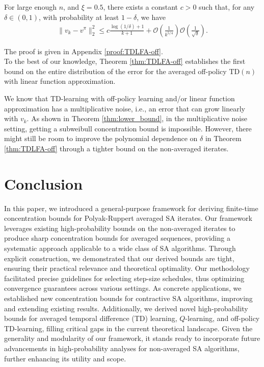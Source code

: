 \documentclass[letterpaper, 10 pt]{article}
\begin{document}
\begin{theorem}\label{thm:TDLFA-off}
    For large enough $n$, and $\xi=0.5$, there exists a constant $c>0$ such that, for any $\delta\in(0,1)$, with probability at least $1-\delta$, we have
    \begin{align*}
        \|v_k-v^\pi\|^2_2\leq c\frac{\log(1/\delta)+1}{k+1} + \mathcal{O}\left(\frac{1}{k^{5/4}}\right)\mathcal{O}\left(\frac{1}{\sqrt{\delta}}\right).
    \end{align*}
\end{theorem}
The proof is given in Appendix \ref{proof:TDLFA-off}.\\

To the best of our knowledge, Theorem \ref{thm:TDLFA-off} establishes the first bound on the entire distribution of the error for the averaged off-policy TD$(n)$ with linear function approximation.



\begin{remark}
We know that TD-learning with off-policy learning and/or linear function approximation has a multiplicative noise, i.e., an error that can grow linearly with $v_k$. As shown in Theorem \ref{thm:lower_bound}, in the multiplicative noise setting, getting a subweibull concentration bound is impossible. However, there might still be room to improve the polynomial dependence on $\delta$ in Theorem \ref{thm:TDLFA-off} through a tighter bound on the non-averaged iterates.    
\end{remark}



\section{Conclusion}
In this paper, we introduced a general-purpose framework for deriving finite-time concentration bounds for Polyak-Ruppert averaged SA iterates. Our framework leverages existing high-probability bounds on the non-averaged iterates to produce sharp concentration bounds for averaged sequences, providing a systematic approach applicable to a wide class of SA algorithms. Through explicit construction, we demonstrated that our derived bounds are tight, ensuring their practical relevance and theoretical optimality. Our methodology facilitated precise guidelines for selecting step-size schedules, thus optimizing convergence guarantees across various settings. As concrete applications, we established new concentration bounds for contractive SA algorithms, improving and extending existing results. Additionally, we derived novel high-probability bounds for averaged temporal difference (TD) learning, $Q$-learning, and off-policy TD-learning, filling critical gaps in the current theoretical landscape. Given the generality and modularity of our framework, it stands ready to incorporate future advancements in high-probability analyses for non-averaged SA algorithms, further enhancing its utility and scope.
\end{document}
